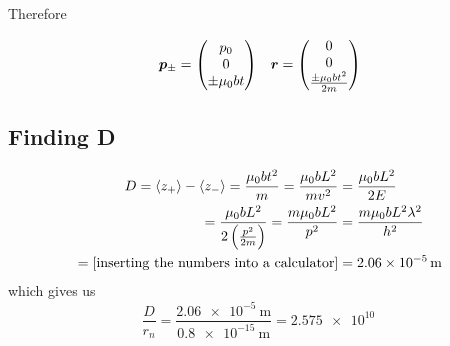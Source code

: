 Therefore

\begin{align}
	\bm{p}_\pm = \begin{pmatrix}p_0\\0\\\pm\mu_0bt\end{pmatrix} && \bm{r} = \begin{pmatrix}0\\0\\\frac{\pm\mu_0bt^2}{2m}\end{pmatrix}
\end{align}

\subsection{Finding D}

\begin{align}
	D = \langle z_+ \rangle - \langle z_- \rangle = \frac{\mu_0bt^2}{m} = \frac{\mu_0bL^2}{mv^2} &= \frac{\mu_0bL^2}{2E}\\
	= \frac{\mu_0bL^2}{2\left(\frac{p^2}{2m}\right)} = \frac{m\mu_0bL^2}{p^2}&=\frac{m\mu_0bL^2\lambda^2}{h^2}\\
	= [\text{inserting the numbers into a calculator}] &= \SI{2.06e-5}{\meter}
\end{align}
which gives us
\begin{equation}
	\frac{D}{r_n} = \frac{\SI{2.06e-5}{\meter}}{\SI{0.8e-15}{\meter}}=\SI{2.575e10}{}
\end{equation}